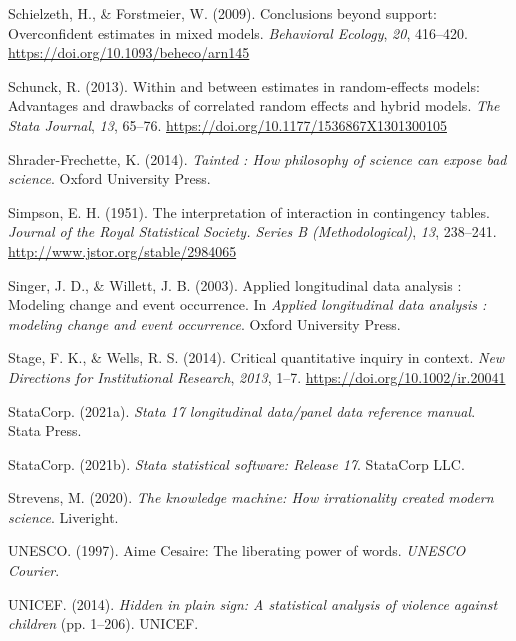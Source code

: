 \documentclass[
  letterpaper,
  DIV=11,
  numbers=noendperiod]{scrreprt}
\newlength{\cslhangindent}
\newenvironment{CSLReferences}[2] %
 {\begin{list}{}{%
  \setlength{\itemindent}{0pt}
  \setlength{\leftmargin}{0pt}
  \setlength{\parsep}{0pt}
  \ifodd #1
   \setlength{\leftmargin}{\cslhangindent}
   \setlength{\itemindent}{-1\cslhangindent}
  \fi
  \setlength{\itemsep}{#2\baselineskip}}}
 {\end{list}}
\begin{document}
\begin{CSLReferences}{1}{0}
Schielzeth, H., \& Forstmeier, W. (2009). Conclusions beyond support:
Overconfident estimates in mixed models. \emph{Behavioral Ecology},
\emph{20}, 416--420. \url{https://doi.org/10.1093/beheco/arn145}

Schunck, R. (2013). Within and between estimates in random-effects
models: Advantages and drawbacks of correlated random effects and hybrid
models. \emph{The Stata Journal}, \emph{13}, 65--76.
\url{https://doi.org/10.1177/1536867X1301300105}

Shrader-Frechette, K. (2014). \emph{Tainted : How philosophy of science
can expose bad science}. Oxford University Press.

Simpson, E. H. (1951). The interpretation of interaction in contingency
tables. \emph{Journal of the Royal Statistical Society. Series B
(Methodological)}, \emph{13}, 238--241.
\url{http://www.jstor.org/stable/2984065}

Singer, J. D., \& Willett, J. B. (2003). Applied longitudinal data
analysis : Modeling change and event occurrence. In \emph{Applied
longitudinal data analysis : modeling change and event occurrence}.
Oxford University Press.

Stage, F. K., \& Wells, R. S. (2014). Critical quantitative inquiry in
context. \emph{New Directions for Institutional Research}, \emph{2013},
1--7. \url{https://doi.org/10.1002/ir.20041}

StataCorp. (2021a). \emph{Stata 17 longitudinal data/panel data
reference manual}. Stata Press.

StataCorp. (2021b). \emph{Stata statistical software: Release 17}.
StataCorp LLC.

Strevens, M. (2020). \emph{The knowledge machine: How irrationality
created modern science}. Liveright.

UNESCO. (1997). {A}ime {C}esaire: The liberating power of words.
\emph{UNESCO Courier}.

UNICEF. (2014). \emph{Hidden in plain sign: A statistical analysis of
violence against children} (pp. 1--206). UNICEF.


\end{CSLReferences}
\end{document}

